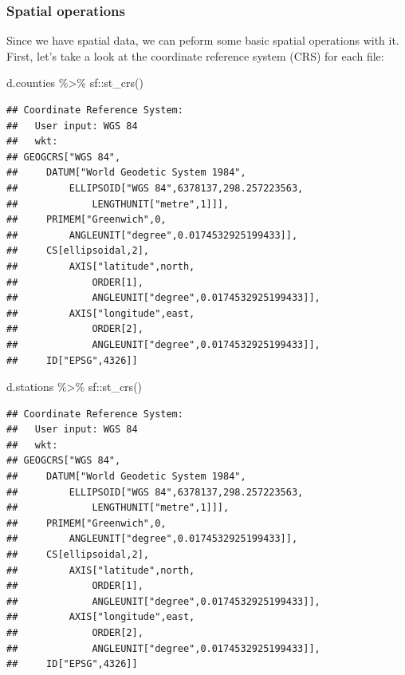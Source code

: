 \documentclass[]{article}
\newenvironment{Shaded}{\begin{snugshade}}{\end{snugshade}}
\newcommand{\FunctionTok}[1]{\textcolor[rgb]{0.00,0.00,0.00}{#1}}
\newcommand{\NormalTok}[1]{#1}
\newcommand{\SpecialCharTok}[1]{\textcolor[rgb]{0.00,0.00,0.00}{#1}}
\begin{document}
\hypertarget{spatial-operations}{%
\subsubsection{Spatial operations}\label{spatial-operations}}

Since we have spatial data, we can peform some basic spatial operations
with it. First, let's take a look at the coordinate reference system
(CRS) for each file:

\begin{Shaded}
\begin{Highlighting}[]
\NormalTok{d.counties }\SpecialCharTok{\%\textgreater{}\%}\NormalTok{ sf}\SpecialCharTok{::}\FunctionTok{st\_crs}\NormalTok{()}
\end{Highlighting}
\end{Shaded}

\begin{verbatim}
## Coordinate Reference System:
##   User input: WGS 84 
##   wkt:
## GEOGCRS["WGS 84",
##     DATUM["World Geodetic System 1984",
##         ELLIPSOID["WGS 84",6378137,298.257223563,
##             LENGTHUNIT["metre",1]]],
##     PRIMEM["Greenwich",0,
##         ANGLEUNIT["degree",0.0174532925199433]],
##     CS[ellipsoidal,2],
##         AXIS["latitude",north,
##             ORDER[1],
##             ANGLEUNIT["degree",0.0174532925199433]],
##         AXIS["longitude",east,
##             ORDER[2],
##             ANGLEUNIT["degree",0.0174532925199433]],
##     ID["EPSG",4326]]
\end{verbatim}

\begin{Shaded}
\begin{Highlighting}[]
\NormalTok{d.stations }\SpecialCharTok{\%\textgreater{}\%}\NormalTok{ sf}\SpecialCharTok{::}\FunctionTok{st\_crs}\NormalTok{()}
\end{Highlighting}
\end{Shaded}

\begin{verbatim}
## Coordinate Reference System:
##   User input: WGS 84 
##   wkt:
## GEOGCRS["WGS 84",
##     DATUM["World Geodetic System 1984",
##         ELLIPSOID["WGS 84",6378137,298.257223563,
##             LENGTHUNIT["metre",1]]],
##     PRIMEM["Greenwich",0,
##         ANGLEUNIT["degree",0.0174532925199433]],
##     CS[ellipsoidal,2],
##         AXIS["latitude",north,
##             ORDER[1],
##             ANGLEUNIT["degree",0.0174532925199433]],
##         AXIS["longitude",east,
##             ORDER[2],
##             ANGLEUNIT["degree",0.0174532925199433]],
##     ID["EPSG",4326]]
\end{verbatim}
\end{document}
